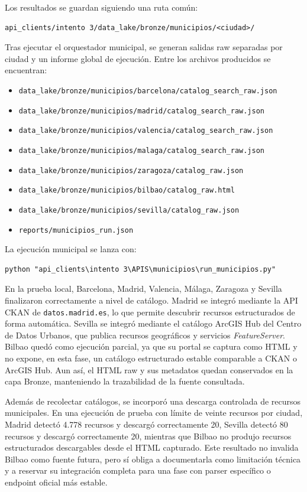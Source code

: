 Los resultados se guardan siguiendo una ruta común:

\begin{verbatim}
api_clients/intento 3/data_lake/bronze/municipios/<ciudad>/
\end{verbatim}

Tras ejecutar el orquestador municipal, se generan salidas raw separadas por ciudad y un informe global de ejecución. Entre los archivos producidos se encuentran:

\begin{itemize}
\item \texttt{data\_lake/bronze/municipios/barcelona/catalog\_search\_raw.json}
\item \texttt{data\_lake/bronze/municipios/madrid/catalog\_search\_raw.json}
\item \texttt{data\_lake/bronze/municipios/valencia/catalog\_search\_raw.json}
\item \texttt{data\_lake/bronze/municipios/malaga/catalog\_search\_raw.json}
\item \texttt{data\_lake/bronze/municipios/zaragoza/catalog\_raw.json}
\item \texttt{data\_lake/bronze/municipios/bilbao/catalog\_raw.html}
\item \texttt{data\_lake/bronze/municipios/sevilla/catalog\_raw.json}
\item \texttt{reports/municipios\_run.json}
\end{itemize}

La ejecución municipal se lanza con:

\begin{verbatim}
python "api_clients\intento 3\APIS\municipios\run_municipios.py"
\end{verbatim}

En la prueba local, Barcelona, Madrid, Valencia, Málaga, Zaragoza y Sevilla finalizaron correctamente a nivel de catálogo. Madrid se integró mediante la API CKAN de \texttt{datos.madrid.es}, lo que permite descubrir recursos estructurados de forma automática. Sevilla se integró mediante el catálogo ArcGIS Hub del Centro de Datos Urbanos, que publica recursos geográficos y servicios \textit{FeatureServer}. Bilbao quedó como ejecución parcial, ya que su portal se captura como HTML y no expone, en esta fase, un catálogo estructurado estable comparable a CKAN o ArcGIS Hub. Aun así, el HTML raw y sus metadatos quedan conservados en la capa Bronze, manteniendo la trazabilidad de la fuente consultada.

Además de recolectar catálogos, se incorporó una descarga controlada de recursos municipales. En una ejecución de prueba con límite de veinte recursos por ciudad, Madrid detectó 4.778 recursos y descargó correctamente 20, Sevilla detectó 80 recursos y descargó correctamente 20, mientras que Bilbao no produjo recursos estructurados descargables desde el HTML capturado. Este resultado no invalida Bilbao como fuente futura, pero sí obliga a documentarla como limitación técnica y a reservar su integración completa para una fase con parser específico o endpoint oficial más estable.

